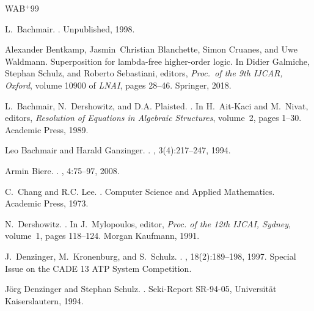 \documentclass{report}
\begin{document}
%
\newcommand{\etalchar}[1]{$^{#1}$}
\begin{thebibliography}{WAB{\etalchar{+}}99}

L.~Bachmair.
.
\newblock Unpublished, 1998.

Alexander Bentkamp, Jasmin~Christian Blanchette, Simon Cruanes, and Uwe
  Waldmann.
\newblock Superposition for lambda-free higher-order logic.
\newblock In Didier Galmiche, Stephan Schulz, and Roberto Sebastiani, editors,
  {\em Proc.\ of the 9th IJCAR, Oxford}, volume 10900 of {\em LNAI}, pages
  28--46. Springer, 2018.

L.~Bachmair, N.~Dershowitz, and D.A. Plaisted.
.
\newblock In H.~Ait-Kaci and M.~Nivat, editors, {\em Resolution of Equations in
  Algebraic Structures}, volume~2, pages 1--30. Academic Press, 1989.

Leo Bachmair and Harald Ganzinger.
.
, 3(4):217--247, 1994.

Armin Biere.
.
,
  4:75--97, 2008.

C.~Chang and R.C. Lee.
.
\newblock Computer Science and Applied Mathematics. Academic Press, 1973.

N.~Dershowitz.
.
\newblock In J.~Mylopoulos, editor, {\em Proc. of the 12th IJCAI, Sydney},
  volume~1, pages 118--124. Morgan Kaufmann, 1991.

J.~Denzinger, M.~Kronenburg, and S.~Schulz.
.
, 18(2):189--198, 1997.
\newblock Special Issue on the CADE 13 ATP System Competition.

J{\"o}rg Denzinger and Stephan Schulz.
.
\newblock Seki-Report SR-94-05, Universit{\"a}t Kai\-sers\-lau\-tern, 1994.


\end{thebibliography}
\end{document}
